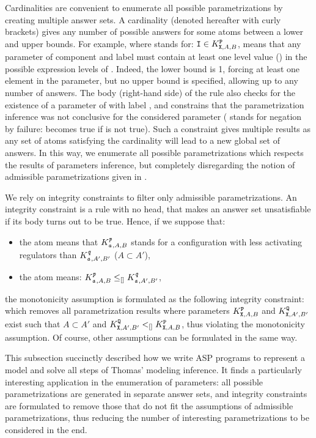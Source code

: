 Cardinalities are convenient to enumerate all possible parametrizations by creating multiple answer sets.
A cardinality (denoted hereafter with curly brackets) gives any number of possible answers for some atoms between a lower and upper bounds.
For example,
where  stands for: $\texttt{I} \in K^{\texttt{P}}_{\texttt{X},A,B}$,
means that any parameter of component  and label  must contain at least one level value () in the possible expression levels of .
Indeed, the lower bound is 1, forcing at least one element in the parameter, but no upper bound is specified, allowing up to any number of answers.
The body (right-hand side) of the rule also checks for the existence of a parameter of  with label , and constrains that the parametrization inference was not conclusive for the considered parameter ( stands for negation by failure:  becomes true if  is not true).
Such a constraint gives multiple results as any set of  atoms satisfying the cardinality will lead to a new global set of answers.
In this way, we enumerate all possible parametrizations which respects the results of parameters
inference, but completely disregarding the notion of admissible parametrizations given in
.

We rely on integrity constraints to filter only admissible parametrizations.
An integrity constraint is a rule with no head, that makes an answer set unsatisfiable if its body turns out to be true.
Hence, if we suppose that:
\begin{itemize}
  \item the  atom means that $K^{\texttt{\textit{p}}}_{\texttt{\textit{a}},A,B}$ stands for a configuration with less activating regulators than $K^{\texttt{\textit{q}}}_{\texttt{\textit{a}},A',B'}$ (\ie $A \subset A'$),
  \item the  atom means: $K^{\texttt{\textit{p}}}_{\texttt{\textit{a}},A,B} \leq_{[]} K^{\texttt{\textit{q}}}_{\texttt{\textit{a}},A',B'}$,
\end{itemize}
the monotonicity assumption is formulated as the following integrity constraint:
which removes all parametrization results where parameters $K^{\texttt{P}}_{\texttt{X},A,B}$ and $K^{\texttt{Q}}_{\texttt{X},A',B'}$ exist such that $A \subset A'$ and $K^{\texttt{Q}}_{\texttt{X},A',B'} <_{[]} K^{\texttt{P}}_{\texttt{X},A,B}$, thus violating the monotonicity assumption.
Of course, other assumptions can be formulated in the same way.

This subsection succinctly described how we write ASP programs to represent a model and solve all steps of Thomas' modeling inference.
It finds a particularly interesting application in the enumeration of parameters: all possible parametrizations are generated in separate answer sets, and integrity constraints are formulated to remove those that do not fit the assumptions of admissible parametrizations,
thus reducing the number of interesting parametrizations to be considered in the end.
